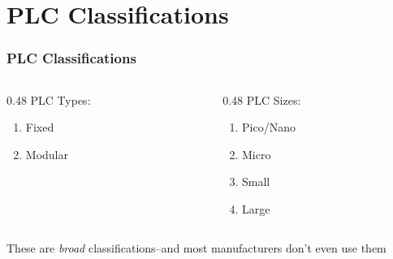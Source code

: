 \section{PLC Classifications}

\begin{frame}
    \frametitle{PLC Classifications}

    \begin{columns}[t]
        \begin{column}{0.48\linewidth}
            PLC Types:
            \begin{enumerate}
                \item Fixed
                \item Modular
            \end{enumerate}
        \end{column}
        \begin{column}{0.48\linewidth}
            PLC Sizes:
            \begin{enumerate}
                \item Pico/Nano
                \item Micro
                \item Small
                \item Large
            \end{enumerate}
        \end{column}
    \end{columns}

    \vspace{0.25in}
    \centering
    {These are \emph{broad} classifications--and most manufacturers don't even use them}
\end{frame}

